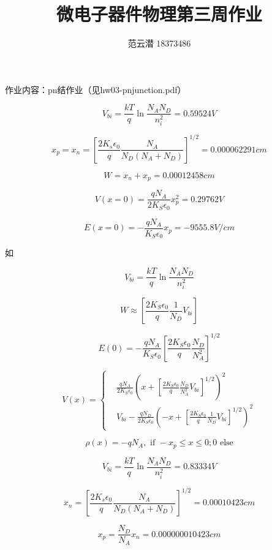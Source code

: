 \documentclass[lang=cn,11pt,a4paper,cite=authoryear]{elegantpaper}
\title{微电子器件物理\quad 第三周作业}
\author{范云潜 18373486}
\institute{微电子学院 184111 班}
\date{\zhtoday}
\begin{document}
\maketitle

作业内容：pn结作业（见hw03-pnjunction.pdf）



\[V_{bi} = \frac{kT}{q}\ln \frac{N_A N_D}{n_i^2} =  0.59524 V\]


\[x_p = x_n = \left[\frac{2 K_s \epsilon_0}{q} \frac{N_A}{N_D(N_A + N_D)}\right]^{1/2} = 0.000062291 cm\] 

\[W = x_n + x_p = 0.00012458 cm\]


\[V(x = 0) = \frac{q N_A}{2K_S \epsilon_0} x_p^2 = 0.29762 V\]

\[E(x=0) = - \frac{q N_A}{K_S \epsilon_0} x_p = -9555.8 V/cm\]


如  




\[V_{bi} = \frac{kT}{q}\ln \frac{N_A N_D}{n_i^2}\]

\[W \approx \left[\frac{2K_S\epsilon_0}{q} \frac{1}{N_D}V_{bi}\right]\]

\[E(0) = - \frac{q N_A}{K_S \epsilon_0} \left[\frac{2K_S \epsilon_0}{q}\frac{N_D}{N_A^2}\right]^{1/2}\]

\[V(x) = \left\{ \begin{aligned}
    &\frac{q N_A}{2 K_S \epsilon_0} (x+[\frac{2K_S\epsilon_0}{q} \frac{N_D}{N_A^2}V_{bi}]^{1/2})^2  \\
    &V_{bi}-\frac{q N_D}{2 K_S \epsilon_0} (-x+[\frac{2K_S\epsilon_0}{q} \frac{1}{N_D}V_{bi}]^{1/2})^2 
\end{aligned} \right.\]

\[\rho(x) = -q N_A, \text{ if } -x_p \leq x \leq 0; 0 \text{ else}\]



\[V_{bi} = \frac{kT}{q}\ln \frac{N_A N_D}{n_i^2} =  0.83334V\]


\[x_n = \left[\frac{2 K_s \epsilon_0}{q} \frac{N_A}{N_D(N_A + N_D)}\right]^{1/2} = 0.00010423 cm\]

\[x_p = \frac{N_D}{N_A} x_n = 0.000000010423 cm\]
\end{document}
